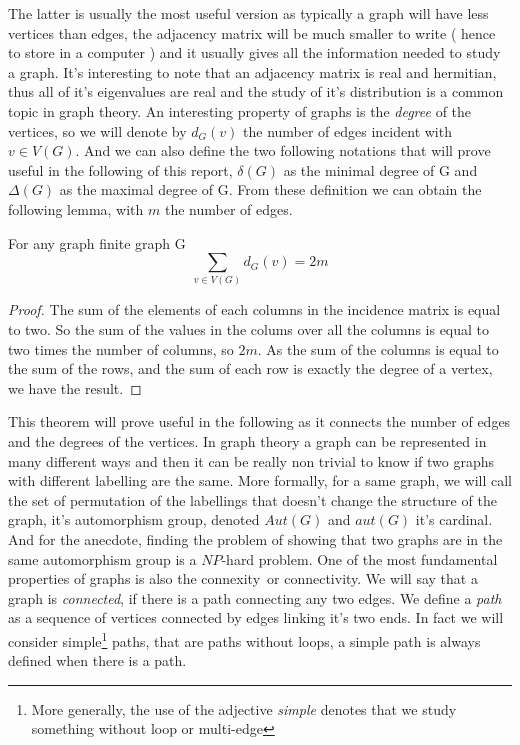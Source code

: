 The latter is usually the most useful version as typically a graph will have less vertices than edges, the adjacency matrix will be much smaller to write ( hence to store in a computer ) and it usually gives all the information needed to study a graph. 
It's interesting to note that an adjacency matrix is real and hermitian, thus all of it's eigenvalues are real and the study of it's distribution is a common topic in graph theory.
\newline
An interesting property of graphs is the \emph{degree} of the vertices, so we will denote by $d_G(v)$ the number of edges incident with $v \in V(G)$. And we can also define the two following notations that will prove useful in the following of this report, $\delta(G)$ as the minimal degree of G and $\Delta(G)$ as the maximal degree of G.
From these definition we can obtain the following lemma, with $m$ the number of edges.
\begin{theorem}
For any graph finite graph G
\begin{equation}
    \sum_{v\in V(G)} d_G(v) = 2m
\end{equation}
\end{theorem}
\begin{proof}
The sum of the elements of each columns in the incidence matrix is equal to two. So the sum of the values in the colums over all the columns is equal to two times the number of columns, so $2m$. As the sum of the columns is equal to the sum of the rows, and the sum of each row is exactly the degree of a vertex, we have the result.  
\end{proof}
This theorem will prove useful in the following as it connects the number of edges and the degrees of the vertices.
In graph theory a graph can be represented in many different ways and then it can be really non trivial to know if two graphs with different labelling are the same. More formally, for a same graph, we will call the set of permutation of the labellings that doesn't change the structure of the graph, it's automorphism group, denoted $Aut(G)$ and $aut(G)$ it's cardinal. And for the anecdote, finding the problem of showing that two graphs are in the same automorphism group is a $NP$-hard problem.
\newline
One of the most fundamental properties of graphs is also the connexity or connectivity. 
We will say that a graph is \emph{connected}, if there is a path connecting any two edges. 
We define a \emph{path} as a sequence of vertices connected by edges linking it's two ends. 
In fact we will consider simple\footnote{ More generally, the use of the adjective \emph{simple} denotes that we study something without loop or multi-edge}  paths, that are paths without loops, a simple path is always defined when there is a path. 

